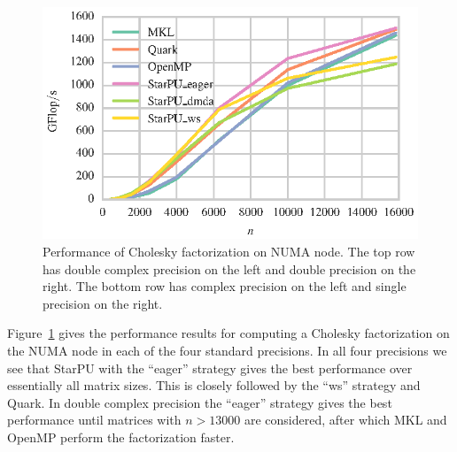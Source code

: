 \documentclass[a4paper,12pt]{article}
\begin{document}
\begin{figure}[t]
  \includegraphics[scale=.85]{fig/kebnekaise_spotrf_weak_scaling.eps}
  \caption{Performance of Cholesky factorization on NUMA node.
    The top row has double complex precision on the left and double
    precision on the right.
    The bottom row has complex precision on the left and single
    precision on the right.}
  \label{fig.chol_numa}
\end{figure}

Figure~\ref{fig.chol_numa} gives the performance results
for computing a Cholesky factorization on the NUMA node
in each of the four standard precisions.
In all four precisions we see that StarPU with
the ``eager'' strategy gives the best performance over
essentially all matrix sizes.
This is closely followed by the ``ws'' strategy
and Quark.
In double complex precision the ``eager'' strategy
gives the best performance until matrices with
$n > 13000$ are considered,
after which MKL and OpenMP perform the factorization faster.
\end{document}
